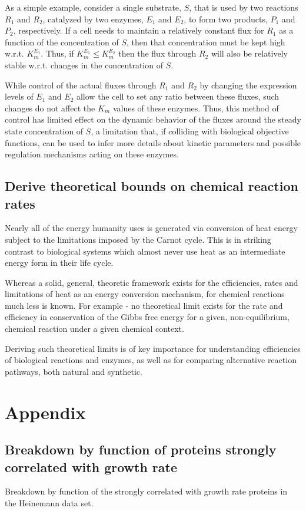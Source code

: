 \documentclass[notitlepage]{article}
\begin{document}
As a simple example, consider a single substrate, $S$, that is used by two reactions $R_1$ and $R_2$, catalyzed by two enzymes, $E_1$ and $E_2$, to form two products, $P_1$ and $P_2$, respectively.
If a cell needs to maintain a relatively constant flux for $R_1$ as a function of the concentration of $S$, then that concentration must be kept high w.r.t. $K_m^{E_1}$.
Thus, if $K_m^{E_1} \le K_m^{E_2}$ then the flux through $R_2$ will also be relatively stable w.r.t. changes in the concentration of $S$.

While control of the actual fluxes through $R_1$ and $R_2$ by changing the expression levels of $E_1$ and $E_2$ allow the cell to set any ratio between these fluxes, such changes do not affect the $K_m$ values of these enzymes.
Thus, this method of control has limited effect on the dynamic behavior of the fluxes around the steady state concentration of $S$, a limitation that, if colliding with biological objective functions, can be used to infer more details about kinetic parameters and possible regulation mechanisms acting on these enzymes.

\subsection{Derive theoretical bounds on chemical reaction rates}
Nearly all of the energy humanity uses is generated via conversion of heat energy subject to the limitations imposed by the Carnot cycle.
This is in striking contrast to biological systems which almost never use heat as an intermediate energy form in their life cycle.

Whereas a solid, general, theoretic framework exists for the efficiencies, rates and limitations of heat as an energy conversion mechanism, for chemical reactions much less is known.
For example - no theoretical limit exists for the rate and efficiency in conservation of the Gibbs free energy for a given, non-equilibrium, chemical reaction under a given chemical context.

Deriving such theoretical limits is of key importance for understanding efficiencies of biological reactions and enzymes, as well as for comparing alternative reaction pathways, both natural and synthetic.

\section{Appendix}
\subsection{Breakdown by function of proteins strongly correlated with growth rate}
\begin{table}[H]
\centering
\caption{Breakdown by function of the strongly correlated with growth rate proteins in the Heinemann data set.}
\label{tab:corrbreakdownh}
\end{table}
\end{document}
